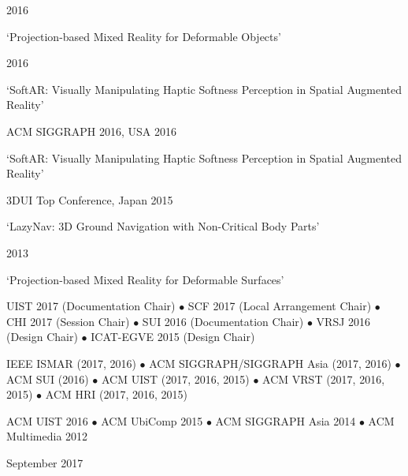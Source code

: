 \documentclass[11pt]{article} %
\begin{document}

\begin{description}
	\squish
           {}
           {2016}

    `Projection-based Mixed Reality for Deformable Objects'

           {}
           {2016}
           
	`SoftAR: Visually Manipulating Haptic Softness Perception in Spatial Augmented Reality'

           {ACM SIGGRAPH 2016, USA}
           {2016}

    `SoftAR: Visually Manipulating Haptic Softness Perception in Spatial Augmented Reality'

		   {3DUI Top Conference, Japan}
		   {2015}

	`LazyNav: 3D Ground Navigation with Non-Critical Body Parts'

		   {}
		   {2013}

	`Projection-based Mixed Reality for Deformable Surfaces'

\end{description}

\pagebreak


{}

UIST 2017 (Documentation Chair) $\bullet$ SCF 2017 (Local Arrangement Chair) $\bullet$ CHI 2017 (Session Chair) $\bullet$ SUI 2016 (Documentation Chair) $\bullet$ VRSJ 2016 (Design Chair) $\bullet$ ICAT-EGVE 2015 (Design Chair)

{}

IEEE ISMAR (2017, 2016) $\bullet$ ACM SIGGRAPH/SIGGRAPH Asia (2017, 2016) $\bullet$ ACM SUI (2016) $\bullet$ ACM UIST (2017, 2016, 2015) $\bullet$ ACM VRST (2017, 2016, 2015) $\bullet$ ACM HRI (2017, 2016, 2015)

{}

ACM UIST 2016 $\bullet$ ACM UbiComp 2015 $\bullet$ ACM SIGGRAPH Asia 2014 $\bullet$ ACM Multimedia 2012

	\bigskip
	\hfill \small September 2017
\end{document}
